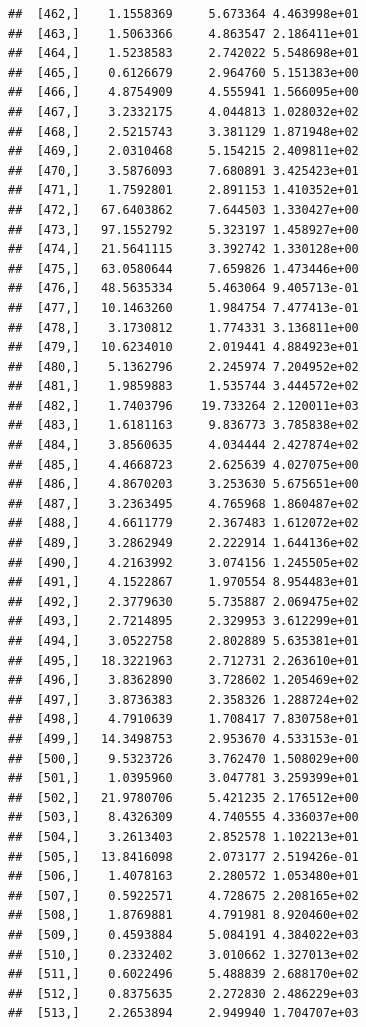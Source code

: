 \documentclass[article]{jss}\usepackage[]{graphicx}\usepackage[]{xcolor}
\makeatletter
\newenvironment{kframe}{%
 \def\at@end@of@kframe{}%
 \ifinner\ifhmode%
  \def\at@end@of@kframe{\end{minipage}}%
  \begin{minipage}{\columnwidth}%
 \fi\fi%
 \def\FrameCommand##1{\hskip\@totalleftmargin \hskip-\fboxsep
 \colorbox{shadecolor}{##1}\hskip-\fboxsep
     \hskip-\linewidth \hskip-\@totalleftmargin \hskip\columnwidth}%
 \MakeFramed {\advance\hsize-\width
   \@totalleftmargin\z@ \linewidth\hsize
   \@setminipage}}%
 {\par\unskip\endMakeFramed%
 \at@end@of@kframe}
\newenvironment{knitrout}{}{} %
\makeatother
\begin{document}
\begin{knitrout}
\begin{kframe}
\begin{verbatim}
##  [462,]    1.1558369     5.673364 4.463998e+01
##  [463,]    1.5063366     4.863547 2.186411e+01
##  [464,]    1.5238583     2.742022 5.548698e+01
##  [465,]    0.6126679     2.964760 5.151383e+00
##  [466,]    4.8754909     4.555941 1.566095e+00
##  [467,]    3.2332175     4.044813 1.028032e+02
##  [468,]    2.5215743     3.381129 1.871948e+02
##  [469,]    2.0310468     5.154215 2.409811e+02
##  [470,]    3.5876093     7.680891 3.425423e+01
##  [471,]    1.7592801     2.891153 1.410352e+01
##  [472,]   67.6403862     7.644503 1.330427e+00
##  [473,]   97.1552792     5.323197 1.458927e+00
##  [474,]   21.5641115     3.392742 1.330128e+00
##  [475,]   63.0580644     7.659826 1.473446e+00
##  [476,]   48.5635334     5.463064 9.405713e-01
##  [477,]   10.1463260     1.984754 7.477413e-01
##  [478,]    3.1730812     1.774331 3.136811e+00
##  [479,]   10.6234010     2.019441 4.884923e+01
##  [480,]    5.1362796     2.245974 7.204952e+02
##  [481,]    1.9859883     1.535744 3.444572e+02
##  [482,]    1.7403796    19.733264 2.120011e+03
##  [483,]    1.6181163     9.836773 3.785838e+02
##  [484,]    3.8560635     4.034444 2.427874e+02
##  [485,]    4.4668723     2.625639 4.027075e+00
##  [486,]    4.8670203     3.253630 5.675651e+00
##  [487,]    3.2363495     4.765968 1.860487e+02
##  [488,]    4.6611779     2.367483 1.612072e+02
##  [489,]    3.2862949     2.222914 1.644136e+02
##  [490,]    4.2163992     3.074156 1.245505e+02
##  [491,]    4.1522867     1.970554 8.954483e+01
##  [492,]    2.3779630     5.735887 2.069475e+02
##  [493,]    2.7214895     2.329953 3.612299e+01
##  [494,]    3.0522758     2.802889 5.635381e+01
##  [495,]   18.3221963     2.712731 2.263610e+01
##  [496,]    3.8362890     3.728602 1.205469e+02
##  [497,]    3.8736383     2.358326 1.288724e+02
##  [498,]    4.7910639     1.708417 7.830758e+01
##  [499,]   14.3498753     2.953670 4.533153e-01
##  [500,]    9.5323726     3.762470 1.508029e+00
##  [501,]    1.0395960     3.047781 3.259399e+01
##  [502,]   21.9780706     5.421235 2.176512e+00
##  [503,]    8.4326309     4.740555 4.336037e+00
##  [504,]    3.2613403     2.852578 1.102213e+01
##  [505,]   13.8416098     2.073177 2.519426e-01
##  [506,]    1.4078163     2.280572 1.053480e+01
##  [507,]    0.5922571     4.728675 2.208165e+02
##  [508,]    1.8769881     4.791981 8.920460e+02
##  [509,]    0.4593884     5.084191 4.384022e+03
##  [510,]    0.2332402     3.010662 1.327013e+02
##  [511,]    0.6022496     5.488839 2.688170e+02
##  [512,]    0.8375635     2.272830 2.486229e+03
##  [513,]    2.2653894     2.949940 1.704707e+03

\end{verbatim}
\end{kframe}
\end{knitrout}
\end{document}
